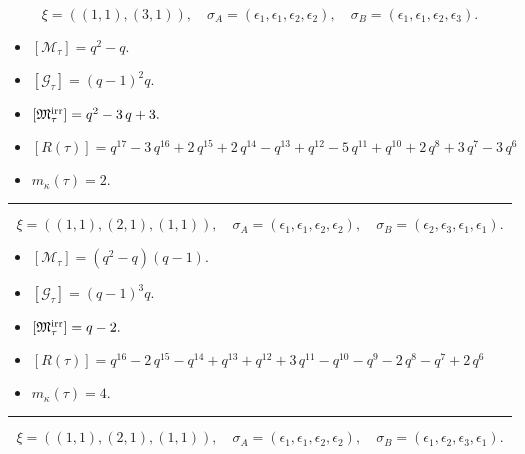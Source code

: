 \documentclass[10pt,a4paper]{amsart}
\begin{document}
$$\xi = ({(1, 1)}, {(3, 1)}),\quad \sigma_A = ({{\epsilon_1}}, {{\epsilon_1, \epsilon_2, \epsilon_2}}),\quad \sigma_B = ({{\epsilon_1}}, {{\epsilon_1, \epsilon_2, \epsilon_3}}).$$

\begin{itemize}
 \item $[\mathcal{M}_{\tau}] = q^{2} - q .$

 \item $[\mathcal{G}_{\tau}] = {\left(q - 1\right)}^{2} q .$

 \item $[{\frak M}_{\tau}^{\textrm{irr}}] = q^{2} - 3 \, q + 3 .$

 \item $[R(\tau)] = q^{17} - 3 \, q^{16} + 2 \, q^{15} + 2 \, q^{14} - q^{13} + q^{12} - 5 \, q^{11} + q^{10} + 2 \, q^{8} + 3 \, q^{7} - 3 \, q^{6} $

 \item $m_{\kappa}(\tau) = 2 .$

 \end{itemize}
\noindent\rule{8cm}{0.4pt}

$$\xi = ({(1, 1)}, {(2, 1), (1, 1)}),\quad \sigma_A = ({{\epsilon_1}}, {{\epsilon_1, \epsilon_2}, {\epsilon_2}}),\quad \sigma_B = ({{\epsilon_2}}, {{\epsilon_3, \epsilon_1}, {\epsilon_1}}).$$

\begin{itemize}
 \item $[\mathcal{M}_{\tau}] = {\left(q^{2} - q\right)} {\left(q - 1\right)} .$

 \item $[\mathcal{G}_{\tau}] = {\left(q - 1\right)}^{3} q .$

 \item $[{\frak M}_{\tau}^{\textrm{irr}}] = q - 2 .$

 \item $[R(\tau)] = q^{16} - 2 \, q^{15} - q^{14} + q^{13} + q^{12} + 3 \, q^{11} - q^{10} - q^{9} - 2 \, q^{8} - q^{7} + 2 \, q^{6} $

 \item $m_{\kappa}(\tau) = 4 .$

 \end{itemize}
\noindent\rule{8cm}{0.4pt}

$$\xi = ({(1, 1)}, {(2, 1)}, {(1, 1)}),\quad \sigma_A = ({{\epsilon_1}}, {{\epsilon_1, \epsilon_2}}, {{\epsilon_2}}),\quad \sigma_B = ({{\epsilon_1}}, {{\epsilon_2, \epsilon_3}}, {{\epsilon_1}}).$$
\end{document}
